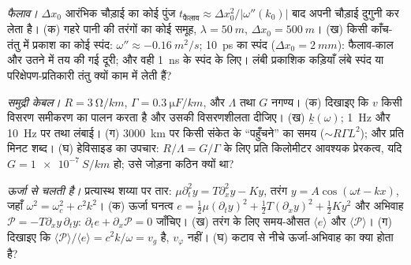 \begin{exercise}[$\star\star$]\label{exo:b2:dispersion-wave-packets:8}
\emph{फैलाव।} $\Delta x_0$ आरंभिक चौड़ाई का कोई पुंज
$t_{\text{फैलाव}} \approx \Delta x_0^2/|\omega''(k_0)|$ बाद अपनी चौड़ाई दुगुनी कर लेता है। (क) गहरे पानी की
तरंगों का कोई समूह, $\lambda = \qty{50}{m}$, $\Delta x_0 = \qty{500}{m}$। (ख) किसी काँच-तंतु में
प्रकाश का कोई स्पंद: $\omega'' \approx \qty{-0.16}{m^2/s}$; \qty{10}{ps} का स्पंद ($\Delta x_0 =
\qty{2}{mm}$): फैलाव-काल और उतने में तय की गई दूरी; और वही
\qty{1}{ns} के स्पंद के लिए। लंबी प्रकाशिक कड़ियाँ लंबे स्पंद या
परिक्षेपण-प्रतिकारी तंतु क्यों काम में लेती हैं?
\end{exercise}

\begin{exercise}[$\star\star$]\label{exo:b2:dispersion-wave-packets:9}
\emph{समुद्री केबल।} $R = \qty{3}{\ohm/km}$, $\Gamma = \qty{0.3}{\micro F/km}$,
और $\Lambda$ तथा $G$ नगण्य। (क) दिखाइए कि $v$ किसी विसरण समीकरण का पालन करता है और
उसकी विसरणशीलता दीजिए। (ख)  $\underline k(\omega)$; \qty{1}{Hz} और \qty{10}{Hz} पर  तथा  लंबाई। (ग)
\qty{3000}{km} पर किसी संकेत के ``पहुँचने'' का समय ($\sim R\Gamma L^2$); और प्रति
मिनट शब्द। (घ) हेविसाइड का उपचार: $R/\Lambda = G/\Gamma$ के लिए प्रति किलोमीटर
आवश्यक प्रेरकत्व, यदि $G = \qty{1e-7}{S/km}$ हो; उसे जोड़ना कठिन क्यों था?
\end{exercise}

\begin{exercise}[$\star\star\star$]\label{exo:b2:dispersion-wave-packets:10}
\emph{ऊर्जा  से चलती है।} प्रत्यास्थ शय्या पर तार:
$\mu\partial_t^2y = T\partial_x^2y - Ky$, तरंग $y = A\cos(\omega t - kx)$, जहाँ $\omega^2 =
\omega_c^2 + c^2k^2$। (क) ऊर्जा घनत्व $e = \tfrac12\mu(\partial_ty)^2 + \tfrac12T
(\partial_xy)^2 + \tfrac12Ky^2$ और अभिवाह $\mathcal P = -T\partial_xy\,\partial_ty$:
$\partial_te + \partial_x\mathcal P = 0$ जाँचिए। (ख) तरंग के लिए समय-औसत $\langle e\rangle$ और
$\langle\mathcal P\rangle$। (ग) दिखाइए कि $\langle\mathcal P\rangle/
\langle e\rangle = c^2k/\omega = v_g$ है, $v_\varphi$ नहीं। (घ) कटाव से नीचे
ऊर्जा-अभिवाह का क्या होता है?
\end{exercise}

